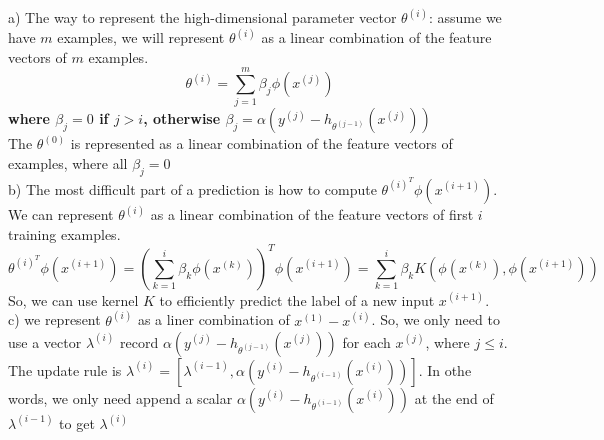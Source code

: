 \begin{answer}\\
a) The way to represent the high-dimensional parameter vector $\theta^{(i)}$: assume we have $m$ examples, we will represent $\theta^{(i)}$ as a linear combination of the feature vectors of $m$ examples. $$\theta^{(i)} = \sum\limits_{j=1}^m \beta_j \phi(x^{(j)})$$ \textbf{where $\beta_j = 0$ if $j > i$, otherwise $\beta_j = \alpha (y^{(j)} - h_{\theta^{(j-1)}} (x^{(j)}))$}\\
The $\theta^{(0)}$ is represented as a linear combination of the feature vectors of examples, where all $\beta_j = 0$ \\
b) The most difficult part of a prediction is how to compute $\theta^{{(i)}^T} \phi(x^{(i+1)})$. We can represent $\theta^{(i)}$ as a linear combination of the feature vectors of first $i$ training examples.
$$\theta^{{(i)}^T} \phi(x^{(i+1)}) = (\sum\limits_{k=1}^i \beta_k \phi(x^{(k)}))^T \phi(x^{(i+1)}) = \sum\limits_{k=1}^i \beta_k K(\phi(x^{(k)}), \phi(x^{(i+1)}))$$
So, we can use kernel $K$ to efficiently predict the label of a new input $x^{(i+1)}$.\\
c) we represent $\theta^{(i)}$ as a liner combination of $x^{(1)}-x^{(i)}$. So, we only need to use a vector $\lambda^{(i)}$ record $\alpha(y^{(j)} - h_{\theta^{(j-1)}}(x^{(j)}))$ for each $x^{(j)}$, where $j\leq i$.\\
The update rule is $\lambda^{(i)} = [\lambda^{(i-1)}, \alpha(y^{(i)} - h_{\theta^{(i-1)}}(x^{(i)}))]$. In othe words, we only need append a scalar $\alpha(y^{(i)} - h_{\theta^{(i-1)}}(x^{(i)}))$ at the end of $\lambda^{(i-1)}$ to get $\lambda^{(i)}$
\end{answer}
